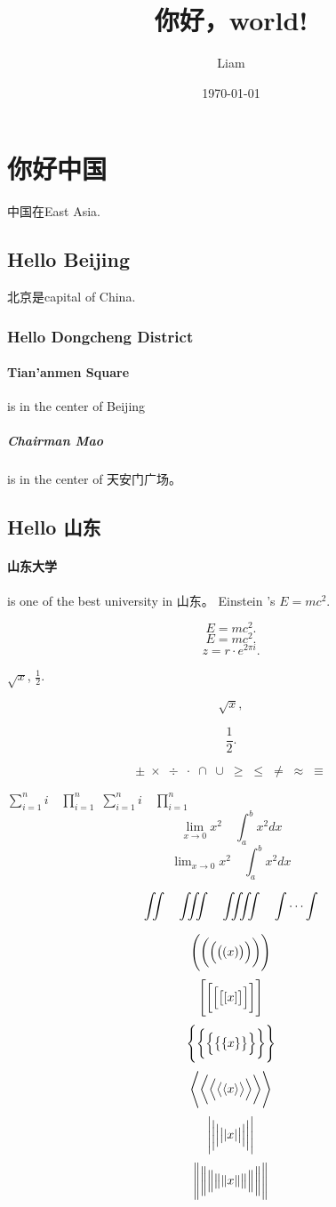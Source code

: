 \documentclass[UTF8]{ctexart}
\title{你好，world!}
\author{Liam}
\date{\today}
\begin{document}
\maketitle
\tableofcontents
\section{你好中国}
中国在East Asia.
\subsection{Hello Beijing}
北京是capital of China.
\subsubsection{Hello Dongcheng District}
\paragraph{Tian'anmen Square}
is in the center of Beijing
\subparagraph{Chairman Mao}
is in the center of 天安门广场。
\subsection{Hello 山东}
\paragraph{山东大学} is one of the best university in 山东。
Einstein 's $E=mc^2$.

\[ E=mc^2. \]
\begin{equation}
E=mc^2.
\end{equation}
\[ z = r\cdot e^{2\pi i}. \]

$\sqrt{x}$, $\frac{1}{2}$.

\[ \sqrt{x}, \]

\[ \frac{1}{2}. \]

\[ \pm\; \times \; \div\; \cdot\; \cap\; \cup\;
\geq\; \leq\; \neq\; \approx \; \equiv \]


$ \sum_{i=1}^n i\quad \prod_{i=1}^n $
$ \sum\limits _{i=1}^n i\quad \prod\limits _{i=1}^n $
\[ \lim_{x\to0}x^2 \quad \int_a^b x^2 dx \]
\[ \lim\nolimits _{x\to0}x^2\quad \int\nolimits_a^b x^2 dx \]


\[ \iint\quad \iiint\quad \iiiint\quad \idotsint \]

\[ \Biggl(\biggl(\Bigl(\bigl((x)\bigr)\Bigr)\biggr)\Biggr) \]
\[ \Biggl[\biggl[\Bigl[\bigl[[x]\bigr]\Bigr]\biggr]\Biggr] \]
\[ \Biggl \{\biggl \{\Bigl \{\bigl \{\{x\}\bigr \}\Bigr \}\biggr \}\Biggr\} \]
\[ \Biggl\langle\biggl\langle\Bigl\langle\bigl\langle\langle x
\rangle\bigr\rangle\Bigr\rangle\biggr\rangle\Biggr\rangle \]
\[ \Biggl\lvert\biggl\lvert\Bigl\lvert\bigl\lvert\lvert x
\rvert\bigr\rvert\Bigr\rvert\biggr\rvert\Biggr\rvert \]
\[ \Biggl\lVert\biggl\lVert\Bigl\lVert\bigl\lVert\lVert x
\rVert\bigr\rVert\Bigr\rVert\biggr\rVert\Biggr\rVert \]
\end{document}
